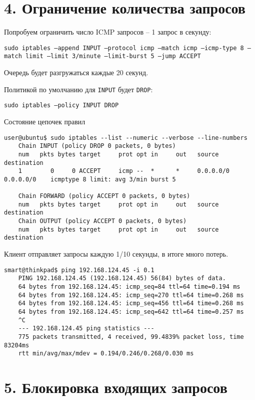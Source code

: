 \section*{4. Ограничение количества запросов}

Попробуем ограничить число ICMP запросов -- 1 запрос в секунду:

\texttt{sudo iptables --append INPUT --protocol icmp --match icmp --icmp-type 8 --match limit --limit 3/minute --limit-burst 5 --jump ACCEPT}

Очередь будет разгружаться каждые 20 секунд.

Политикой по умолчанию для \texttt{INPUT} будет \texttt{DROP}:

\texttt{sudo iptables --policy INPUT DROP}

Состояние цепочек правил
\begin{Verbatim}[frame=single]
    user@ubuntu$ sudo iptables --list --numeric --verbose --line-numbers
    Chain INPUT (policy DROP 0 packets, 0 bytes)
    num   pkts bytes target     prot opt in     out   source       destination
    1        0     0 ACCEPT     icmp --  *      *     0.0.0.0/0    0.0.0.0/0    icmptype 8 limit: avg 3/min burst 5

    Chain FORWARD (policy ACCEPT 0 packets, 0 bytes)
    num   pkts bytes target     prot opt in     out   source       destination
    Chain OUTPUT (policy ACCEPT 0 packets, 0 bytes)
    num   pkts bytes target     prot opt in     out   source       destination
\end{Verbatim}

Клиент отправляет запросы каждую 1/10 секунды, в итоге много потерь.
\begin{Verbatim}[frame=single]
    smart@thinkpad$ ping 192.168.124.45 -i 0.1
    PING 192.168.124.45 (192.168.124.45) 56(84) bytes of data.
    64 bytes from 192.168.124.45: icmp_seq=84 ttl=64 time=0.194 ms
    64 bytes from 192.168.124.45: icmp_seq=270 ttl=64 time=0.268 ms
    64 bytes from 192.168.124.45: icmp_seq=456 ttl=64 time=0.268 ms
    64 bytes from 192.168.124.45: icmp_seq=642 ttl=64 time=0.257 ms
    ^C
    --- 192.168.124.45 ping statistics ---
    775 packets transmitted, 4 received, 99.4839% packet loss, time 83204ms
    rtt min/avg/max/mdev = 0.194/0.246/0.268/0.030 ms
\end{Verbatim}

\section*{5. Блокировка входящих запросов}

